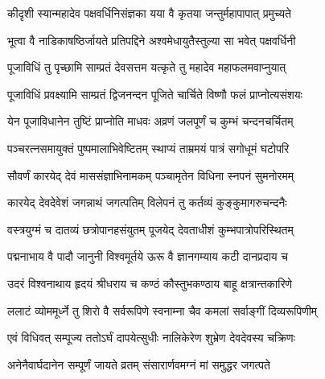 \label{sec:padma-pakshavardhini}

\ganapatyadiDhyanam
\padmaPuranam



\twolineshloka
{कीदृशी स्यान्महादेव पक्षवर्धिनिसंज्ञका}
{यया वै कृतया जन्तुर्महापापात् प्रमुच्यते}%



\twolineshloka
{भूत्वा वै नाडिकाषष्ठिर्जायते प्रतिपद्दिने}
{अश्वमेधायुतैस्तुल्या सा भवेत् पक्षवर्धिनी}%


\twolineshloka
{पूजाविधिं तु पृच्छामि साम्प्रतं देवसत्तम}
{यत्कृते तु महादेव महाफलमवाप्नुयात्}%


\twolineshloka
{पूजाविधिं प्रवक्ष्यामि साम्प्रतं द्विजनन्दन}
{पूजिते चार्चिते विष्णौ फलं प्राप्नोत्यसंशयः}%

\twolineshloka
{येन पूजाविधानेन तुष्टिं प्राप्नोति माधवः}
{अव्रणं जलपूर्णं च कुम्भं चन्दनचर्चितम्}%

\twolineshloka
{पञ्चरत्नसमायुक्तं पुष्पमालाभिवेष्टितम्}
{स्थाप्यं ताम्रमयं पात्रं सगोधूमं घटोपरि}%

\twolineshloka
{सौवर्णं कारयेद् देवं माससंज्ञाभिनामकम्}
{पञ्चामृतेन विधिना स्नपनं सुमनोरमम्}%

\twolineshloka
{कारयेद् देवदेवेशं जगन्नाथं जगत्पतिम्}
{विलेपनं तु कर्तव्यं कुङ्कुमागरुचन्दनैः}%

\twolineshloka
{वस्त्रयुग्मं च दातव्यं छत्रोपानहसंयुतम्}
{पूजयेद् देवताधीशं कुम्भपात्रोपरिस्थितम्}%

\twolineshloka
{पद्मनाभाय वै पादौ जानुनी विश्वमूर्तये}
{ऊरू वै ज्ञानगम्याय कटी दानप्रदाय च}%

\twolineshloka
{उदरं विश्वनाथाय हृदयं श्रीधराय च}
{कण्ठं कौस्तुभकण्ठाय बाहू क्षत्रान्तकारिणे}%

\twolineshloka
{ललाटं व्योममूर्ध्ने तु शिरो वै सर्वरूपिणे}
{स्वनाम्ना चैव कमलां सर्वाङ्गीं दिव्यरूपिणीम्}%

\twolineshloka
{एवं विधिवत् सम्पूज्य ततोऽर्घं दापयेत्सुधीः}
{नालिकेरेण शुभ्रेण देवदेवस्य चक्रिणः}%

\twolineshloka
{अनेनैवार्घदानेन सम्पूर्णं जायते व्रतम्}
{संसारार्णवमग्नं मां समुद्धर जगत्पते}%

